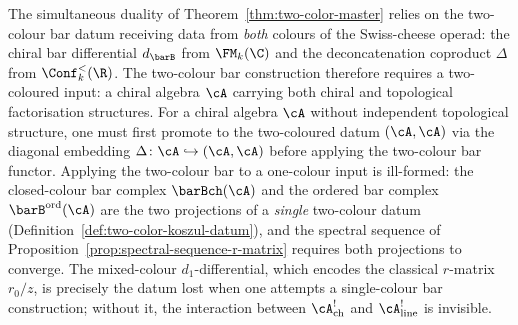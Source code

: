 \begin{remark}\label{rem:sc-two-colour-warning}
The simultaneous duality of Theorem~\ref{thm:two-color-master}
relies on the two-colour bar datum receiving data
from \emph{both} colours of the Swiss-cheese operad: the chiral
bar differential $d_{\barB}$ from $\FM_k(\C)$ and the
deconcatenation coproduct $\Delta$ from $\Conf_k^{<}(\R)$.
The two-colour bar construction therefore requires a
two-coloured input: a chiral algebra $\cA$ carrying both chiral and
topological factorisation structures. For a chiral algebra $\cA$
without independent topological structure, one must first promote to
the two-coloured datum $(\cA, \cA)$ via the diagonal embedding
$\Delta\colon \cA \hookrightarrow (\cA, \cA)$ before applying the
two-colour bar functor. Applying the two-colour bar to a
one-colour input is ill-formed: the closed-colour bar complex
$\barBch(\cA)$ and the ordered bar complex
$\barB^{\mathrm{ord}}(\cA)$ are the two
projections of a \emph{single} two-colour datum
(Definition~\ref{def:two-color-koszul-datum}), and the spectral
sequence of Proposition~\ref{prop:spectral-sequence-r-matrix}
requires both projections to converge.
The mixed-colour $d_1$-differential, which encodes the classical
$r$-matrix $r_0/z$, is precisely the datum lost when one attempts
a single-colour bar construction; without it, the interaction
between $\cA^!_{\mathrm{ch}}$ and $\cA^!_{\mathrm{line}}$ is
invisible.
\end{remark}

